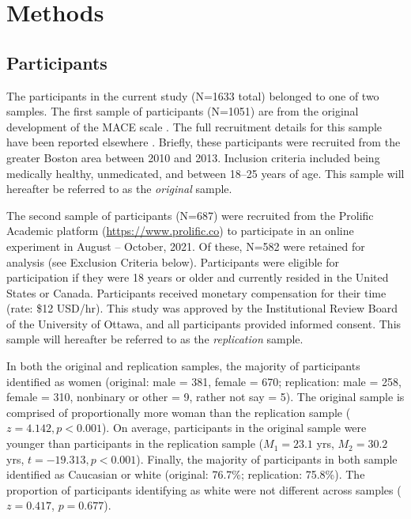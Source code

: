\documentclass[letterpaper,man,natbib]{apa6}  %
\begin{document}
\section{Methods}

\subsection{Participants}

The participants in the current study (N=1633 total) belonged to one of two samples. The first sample of participants (N=1051) are from the original development of the MACE scale \citep{teicher2015maltreatment}. The full recruitment details for this sample have been reported elsewhere \citep{teicher2015maltreatment}. Briefly, these participants were recruited from the greater Boston area between 2010 and 2013. Inclusion criteria included being medically healthy, unmedicated, and between 18–25 years of age.  This sample will hereafter be referred to as the \textit{original} sample. 

The second sample of participants (N=687) were recruited from the Prolific Academic platform (\url{https://www.prolific.co}) to participate in an online experiment in August -- October, 2021. Of these, N=582 were retained for analysis (see Exclusion Criteria below). Participants were eligible for participation if they were 18 years or older and currently resided in the United States or Canada. Participants received monetary compensation for their time (rate: \$12 USD/hr). This study was approved by the Institutional Review Board of the University of Ottawa, and all participants provided informed consent. This sample will hereafter be referred to as the \textit{replication} sample. 

In both the original and replication samples, the majority of participants identified as women (original: male = 381, female = 670; replication: male = 258, female = 310, nonbinary or other = 9, rather not say = 5). The original sample is comprised of proportionally more woman than the replication sample ($z = 4.142, p < 0.001$). On average, participants in the original sample were younger than participants in the replication sample ($M_1 = 23.1$ yrs, $M_2 = 30.2$ yrs, $t = -19.313, p < 0.001$). Finally, the majority of participants in both sample identified as Caucasian or white (original: 76.7\%; replication: 75.8\%). The proportion of participants identifying as white were not different across samples ($z = 0.417$, $p = 0.677$). 
\end{document}
